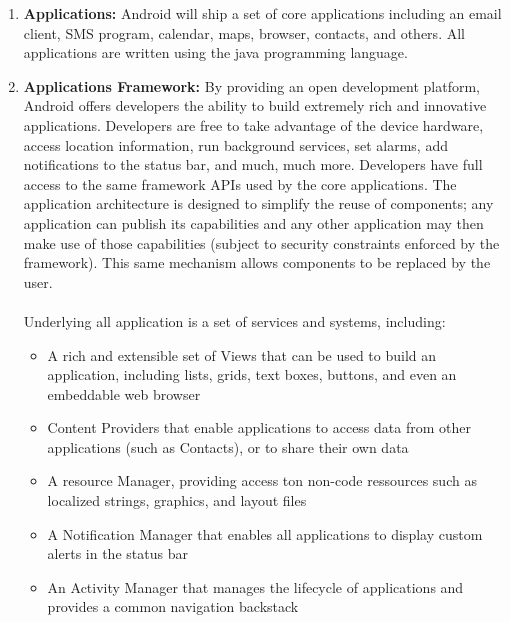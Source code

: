 \begin{itemize}
 \begin{enumerate}
   \item \textbf{Applications: } Android will ship a set of core applications including an email client, SMS program, calendar, maps, browser, contacts,
and others. All applications are written using the java programming language.
   \item \textbf{Applications Framework: }By providing an open development platform, Android offers developers the ability
to build extremely rich and innovative applications. Developers are free to take advantage of the device hardware, access location information, run background
services, set alarms, add notifications to the status bar, and much, much more. Developers have full access to the same framework APIs used by the core applications.
The application architecture is designed to simplify the reuse of components; any application can publish its capabilities and any other application may then 
make use of those capabilities (subject to security constraints enforced by the framework). This same mechanism allows components to be replaced by the user.
\paragraph{} Underlying all application is a set of services and systems, including:
    \begin{itemize}
	  \item A rich and extensible set of Views that can be used to build an application, including lists, grids, text boxes, buttons, and even an embeddable web
	  browser
	  \item Content Providers that enable applications to access data from other applications (such as Contacts), or to share their own data
	  \item A resource Manager, providing access ton non-code ressources such as localized strings, graphics, and layout files
	  \item A Notification Manager that enables all applications to display custom alerts in the status bar
	  \item An Activity Manager that manages the lifecycle of applications and provides a common navigation backstack
	  
    \end{itemize}


\end{enumerate}
\end{itemize}
